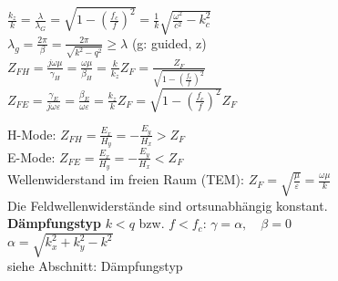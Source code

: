 \documentclass[english]{latex4ei/latex4ei_sheet}
\begin{document}
\begin{sectionbox}
	\begin{emphbox}
		$\frac{k_z}{k} = \frac{\lambda}{\lambda_G} = \sqrt{1- \left(\frac{f_c}{f}\right)^2}=\frac{1}{k}\sqrt{\frac{\omega^{2}}{c^{2}}-k_{c}^{2}}$\\
		$\lambda_{g}=\frac{2 \pi}{\beta}=\frac{2 \pi}{\sqrt{k^{2}-q^{2}}} \geq \lambda$ (g: guided, z)\\
		$Z_{F H} = \frac{j \omega \mu}{\gamma_{H}}=\frac{\omega \mu}{\beta_{H}}=\frac{k}{k_z}Z_F=\frac{Z_{F}}{\sqrt{1 - \left(\frac{f_c}{f}\right)^2}}$\\
		$Z_{F E} = \frac{\gamma_{E}}{j \omega \varepsilon}=\frac{\beta_{E}}{\omega \varepsilon}=\frac{k_z}{k}Z_F=\sqrt{1 - \left(\frac{f_c}{f}\right)^2}Z_{F}$\\
	\end{emphbox}
	H-Mode: $Z_{F H} = \frac{E_x}{H_y} = -\frac{E_y}{H_x} > Z_F$\\
	E-Mode: $Z_{F E} = \frac{E_x}{H_y} = -\frac{E_y}{H_x} < Z_F$\\
	Wellenwiderstand im freien Raum (TEM): $Z_F = \sqrt{\frac{\mu}{\varepsilon}} = \frac{\omega\mu}{k}$\\
	Die Feldwellenwiderstände sind ortsunabhängig konstant.\\

	\textbf{Dämpfungstyp} $k < q$ bzw. $f < f_c$: $\gamma = \alpha, \quad \beta=0$\\
	$\alpha=\sqrt{k_{x}^{2}+k_{y}^{2}-k^{2}}$\\
	siehe Abschnitt: Dämpfungstyp


\end{sectionbox}
\end{document}
